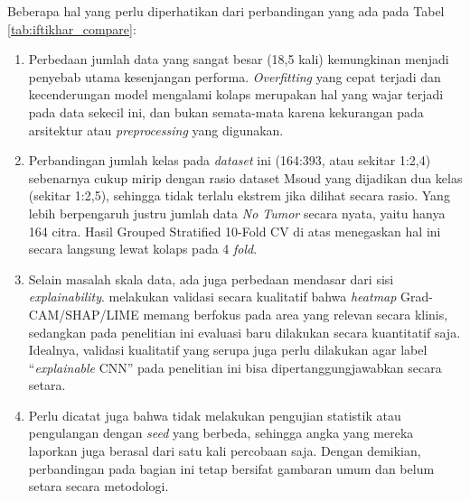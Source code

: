 Beberapa hal yang perlu diperhatikan dari perbandingan yang ada pada Tabel \ref{tab:iftikhar_compare}:
\begin{enumerate}
	\item Perbedaan jumlah data yang sangat besar (18,5 kali) kemungkinan menjadi penyebab utama kesenjangan performa. \textit{Overfitting} yang cepat terjadi dan kecenderungan model mengalami kolaps merupakan hal yang wajar terjadi pada data sekecil ini, dan bukan semata-mata karena kekurangan pada arsitektur atau \textit{preprocessing} yang digunakan.
	\item Perbandingan jumlah kelas pada \textit{dataset} ini (164:393, atau sekitar 1:2,4) sebenarnya cukup mirip dengan rasio dataset Msoud yang dijadikan dua kelas (sekitar 1:2,5), sehingga tidak terlalu ekstrem jika dilihat secara rasio. Yang lebih berpengaruh justru jumlah data \textit{No Tumor} secara nyata, yaitu hanya 164 citra. Hasil Grouped Stratified 10-Fold CV di atas menegaskan hal ini secara langsung lewat kolaps pada 4 \textit{fold}.
	\item Selain masalah skala data, ada juga perbedaan mendasar dari sisi \textit{explainability}. \cite{iftikhar2025explainable} melakukan validasi secara kualitatif bahwa \textit{heatmap} Grad-CAM/SHAP/LIME memang berfokus pada area yang relevan secara klinis, sedangkan pada penelitian ini evaluasi baru dilakukan secara kuantitatif saja. Idealnya, validasi kualitatif yang serupa juga perlu dilakukan agar label ``\textit{explainable} CNN'' pada penelitian ini bisa dipertanggungjawabkan secara setara.
	\item Perlu dicatat juga bahwa \cite{iftikhar2025explainable} tidak melakukan pengujian statistik atau pengulangan dengan \textit{seed} yang berbeda, sehingga angka yang mereka laporkan juga berasal dari satu kali percobaan saja. Dengan demikian, perbandingan pada bagian ini tetap bersifat gambaran umum dan belum setara secara metodologi.
\end{enumerate}

